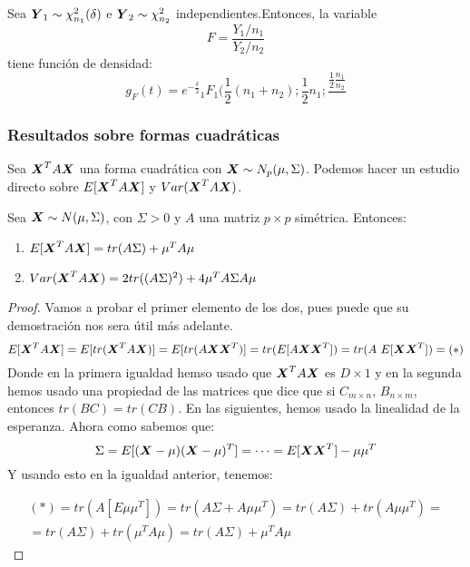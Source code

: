 \begin{ndef}
  Sea $\boldsymbol{Y}_1 \sim \chi_{n_1}^2(\delta)$ e $\boldsymbol{Y}_2 \sim \chi_{n_2}^2$ independientes.Entonces, la variable
  \[
F = \frac{Y_1 / n_1}{Y_2 / n_2}
\]
tiene función de densidad:
\[
g_F(t) = e^{-\frac{\delta}{2}} {}_1F_1(\frac{1}{2}(n_1+n_2); \frac{1}{2}n_1; \frac{\frac{1}{2} \frac{n_1}{n_2}}{}
\]
\end{ndef}


\subsubsection{Resultados sobre formas cuadráticas}

Sea $\boldsymbol{X}^T A \boldsymbol{X}$ una forma cuadrática con $\boldsymbol{X} \sim N_p(\mu,\Sigma)$. Podemos hacer un estudio directo sobre $E[\boldsymbol{X}^T A \boldsymbol{X}]$ y $Var(\boldsymbol{X}^T A \boldsymbol{X})$.
\begin{nprop}
  Sea $\boldsymbol{X} \sim N(\mu,\Sigma)$, con $\Sigma > 0$ y $A$ una matriz $p\times p$ simétrica. Entonces:
  \begin{enumerate}
  \item $E[\boldsymbol{X}^T A \boldsymbol{X}] = tr(A\Sigma) + \mu^T A \mu$
    \item $Var(\boldsymbol{X}^T A \boldsymbol{X}) = 2tr((A\Sigma)^2) + 4\mu^T A \Sigma A \mu$
  \end{enumerate}

\end{nprop}
\begin{proof}
  Vamos a probar el primer elemento de los dos, pues puede que su demostración nos sera útil más adelante.\\

  \[
    E[\vectX^T A \vectX] = E[tr(\vectX^T A \vectX)] = E[tr(A\vectX \vectX^T)] = tr(E[A \vectX \vectX^T]) = tr(A \ E[\vectX \vectX^T]) = (*)
  \]
  Donde en la primera igualdad hemso usado que $\boldsymbol{X}^T A \boldsymbol{X}$ es $D\times 1$ y en la segunda hemos usado una propiedad de las matrices que dice que si $C_{m\times n}$, $B_{n\times m}$, entonces $tr(BC) = tr(CB)$. En las siguientes, hemos usado la linealidad de la esperanza. Ahora como sabemos que:
  \[
  \Sigma = E[(\boldsymbol{X}- \mu)(\boldsymbol{X} - \mu)^T] = \dots = E[\boldsymbol{X} \boldsymbol{X}^T] - \mu \mu^T
  \]
  Y usando esto en la igualdad anterior, tenemos:

  \begin{align}
    (*) = tr(A [ E \mu\mu^T]) = tr(A\Sigma + A \mu\mu^T) = tr(A\Sigma) + tr(A\mu\mu^T) = \\
    = tr(A\Sigma) + tr(\mu^T A \mu) = tr(A\Sigma) + \mu^T A \mu
  \end{align}
\end{proof}

